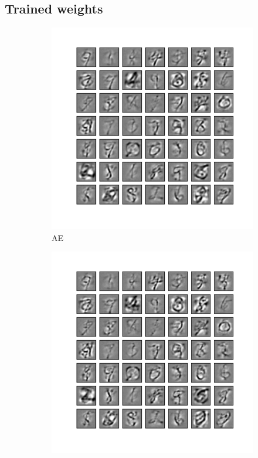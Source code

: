 \subsection{Trained weights}
\label{subsec:MNIST_weight}
\begin{figure}
	\centering
	\begin{subfigure}[t]{0.4\textwidth}
		\includegraphics[width=\textwidth]{pics_sdlm/22_MNIST_AE/2_60000_0.pdf}
		\caption{AE}
	\end{subfigure}
	\begin{subfigure}[t]{0.4\textwidth}
		\includegraphics[width=\textwidth]{pics_sdlm/23_MNIST_AE_noise/2_60000_0.pdf}

\end{subfigure}
\end{figure}
